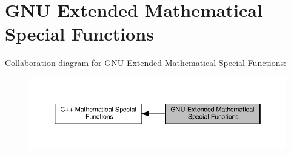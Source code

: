 \hypertarget{group__gnu__math__spec__func}{}\section{G\+NU Extended Mathematical Special Functions}
\label{group__gnu__math__spec__func}
Collaboration diagram for G\+NU Extended Mathematical Special Functions\+:
\nopagebreak
\begin{figure}[H]
\begin{center}
\leavevmode
\includegraphics[width=350pt]{group__gnu__math__spec__func}
\end{center}
\end{figure}
